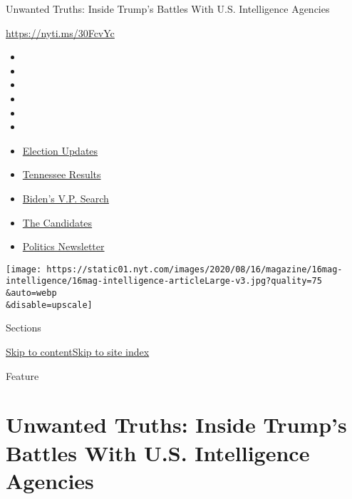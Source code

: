 Unwanted Truths: Inside Trump's Battles With U.S. Intelligence Agencies

\href{https://nyti.ms/30FcvYc}{https://nyti.ms/30FcvYc}

\begin{itemize}
\item
\item
\item
\item
\item
\item
\end{itemize}

\begin{itemize}
\item
  \href{https://www.nytimes.com/2020/08/07/us/elections/biden-vs-trump.html?action=click\&pgtype=Article\&state=default\&region=TOP_BANNER\&context=storylines_menu}{Election
  Updates}
\item
  \href{https://www.nytimes.com/interactive/2020/08/06/us/elections/results-tennessee-primary-elections.html?action=click\&pgtype=Article\&state=default\&region=TOP_BANNER\&context=storylines_menu}{Tennessee
  Results}
\item
  \href{https://www.nytimes.com/article/biden-vice-president-2020.html?action=click\&pgtype=Article\&state=default\&region=TOP_BANNER\&context=storylines_menu}{Biden's
  V.P. Search}
\item
  \href{https://www.nytimes.com/interactive/2019/us/politics/2020-presidential-candidates.html?action=click\&pgtype=Article\&state=default\&region=TOP_BANNER\&context=storylines_menu}{The
  Candidates}
\item
  \href{https://www.nytimes.com/newsletters/politics?action=click\&pgtype=Article\&state=default\&region=TOP_BANNER\&context=storylines_menu}{Politics
  Newsletter}
\end{itemize}

\texttt{[image: https://static01.nyt.com/images/2020/08/16/magazine/16mag-intelligence/16mag-intelligence-articleLarge-v3.jpg?quality=75\\\&auto=webp\\\&disable=upscale]}

Sections

\protect\hyperlink{site-content}{Skip to
content}\protect\hyperlink{site-index}{Skip to site index}

Feature

\hypertarget{unwanted-truths-inside-trumps-battles-with-us-intelligence-agencies}{%
\section{Unwanted Truths: Inside Trump's Battles With U.S. Intelligence
Agencies}\label{unwanted-truths-inside-trumps-battles-with-us-intelligence-agencies}}

